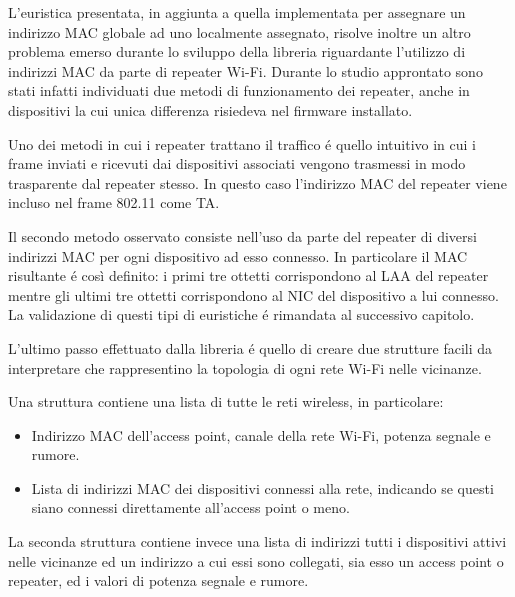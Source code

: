 L'euristica presentata, in aggiunta a quella implementata per assegnare un indirizzo MAC globale ad uno localmente assegnato, risolve inoltre un altro problema emerso durante lo sviluppo della libreria riguardante l'utilizzo di indirizzi MAC da parte di repeater Wi-Fi.
Durante lo studio approntato sono stati infatti individuati due metodi di funzionamento dei repeater, anche in dispositivi la cui unica differenza risiedeva nel firmware installato.

Uno dei metodi in cui i repeater trattano il traffico \'e quello intuitivo in cui i frame inviati e ricevuti dai dispositivi associati vengono trasmessi in modo trasparente dal repeater stesso.
In questo caso l'indirizzo MAC del repeater viene incluso nel frame 802.11 come TA.

Il secondo metodo osservato consiste nell'uso da parte del repeater di diversi indirizzi MAC per ogni dispositivo ad esso connesso.
In particolare il MAC risultante \'e cos\`i definito: i primi tre ottetti corrispondono al LAA del repeater mentre gli ultimi tre ottetti corrispondono al NIC del dispositivo a lui connesso.
La validazione di questi tipi di euristiche \'e rimandata al successivo capitolo.

L'ultimo passo effettuato dalla libreria \'e quello di creare due strutture facili da interpretare che rappresentino la topologia di ogni rete Wi-Fi nelle vicinanze.

Una struttura contiene una lista di tutte le reti wireless, in particolare:

\begin{itemize}
	\item Indirizzo MAC dell'access point, canale della rete Wi-Fi, potenza segnale e rumore.
	\item Lista di indirizzi MAC dei dispositivi connessi alla rete, indicando se questi siano connessi direttamente all'access point o meno.
\end{itemize}

La seconda struttura contiene invece una lista di indirizzi tutti i dispositivi attivi nelle vicinanze ed un indirizzo a cui essi sono collegati, sia esso un access point o repeater, ed i valori di potenza segnale e rumore.


